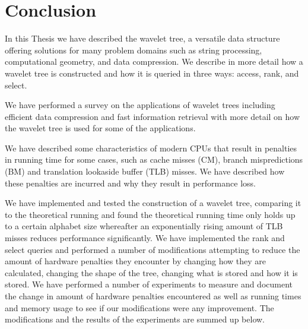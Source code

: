 \section{Conclusion}
In this Thesis we have described the wavelet tree, a versatile data structure offering solutions for many problem domains such as string processing, computational geometry, and data compression.
We describe in more detail how a wavelet tree is constructed and how it is queried in three ways: access, rank, and select.

We have performed a survey on the applications of wavelet trees including efficient data compression and fast information retrieval with more detail on how the wavelet tree is used for some of the applications.

We have described some characteristics of modern CPUs that result in penalties in running time for some cases, such as cache misses (CM), branch mispredictions (BM) and translation lookaside buffer (TLB) misses.
We have described how these penalties are incurred and why they result in performance loss.

We have implemented and tested the construction of a wavelet tree, comparing it to the theoretical running and found the theoretical running time only holds up to a certain alphabet size whereafter an exponentially rising amount of TLB misses reduces performance significantly.
We have implemented the rank and select queries and performed a number of modifications attempting to reduce the amount of hardware penalties they encounter by changing how they are calculated, changing the shape of the tree, changing what is stored and how it is stored.
We have performed a number of experiments to measure and document the change in amount of hardware penalties encountered as well as running times and memory usage to see if our modifications were any improvement.
The modifications and the results of the experiments are summed up below.

